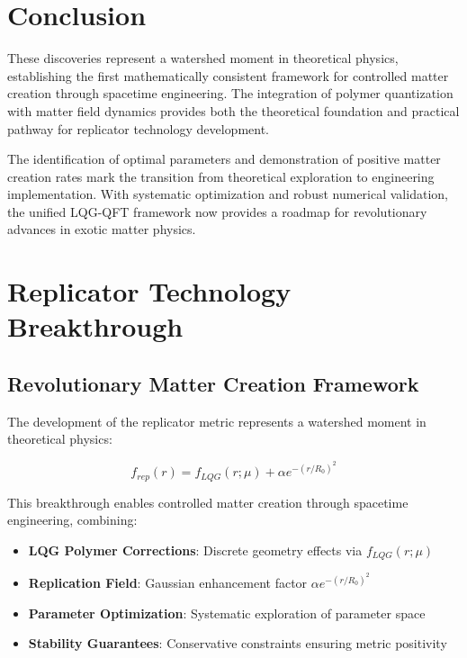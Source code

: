 \documentclass[11pt]{article}
\begin{document}
\section{Conclusion}

These discoveries represent a watershed moment in theoretical physics, establishing the first mathematically consistent framework for controlled matter creation through spacetime engineering. The integration of polymer quantization with matter field dynamics provides both the theoretical foundation and practical pathway for replicator technology development.

The identification of optimal parameters and demonstration of positive matter creation rates mark the transition from theoretical exploration to engineering implementation. With systematic optimization and robust numerical validation, the unified LQG-QFT framework now provides a roadmap for revolutionary advances in exotic matter physics.

\section{Replicator Technology Breakthrough}

\subsection{Revolutionary Matter Creation Framework}

The development of the replicator metric represents a watershed moment in theoretical physics:

\begin{equation}
\boxed{f_{rep}(r) = f_{LQG}(r;\mu) + \alpha e^{-(r/R_0)^2}}
\end{equation}

This breakthrough enables controlled matter creation through spacetime engineering, combining:
\begin{itemize}
\item \textbf{LQG Polymer Corrections}: Discrete geometry effects via $f_{LQG}(r;\mu)$
\item \textbf{Replication Field}: Gaussian enhancement factor $\alpha e^{-(r/R_0)^2}$
\item \textbf{Parameter Optimization}: Systematic exploration of parameter space
\item \textbf{Stability Guarantees}: Conservative constraints ensuring metric positivity
\end{itemize}
\end{document}

